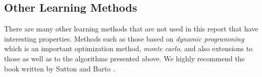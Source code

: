 \documentclass[result.tex]{subfiles}
\begin{document}
    \subsection*{Other Learning Methods}

    There are many other learning methods that are not used in this report that have interesting properties. Methods such as those based on \textit{dynamic programming} which is an important optimization method, \textit{monte carlo}, and also extensions to those as well as to the algorithms presented above. We highly recommend the book written by Sutton and Barto \cite{sutton1998reinforcement}.
\end{document}
